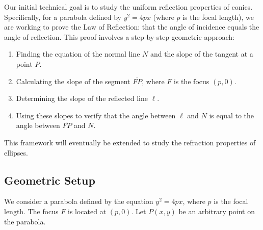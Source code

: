 \documentclass{article}
\begin{document}
Our initial technical goal is to study the uniform reflection properties of conics. Specifically, for a parabola defined by $y^2 = 4px$ (where $p$ is the focal length), we are working to prove the Law of Reflection: that the angle of incidence equals the angle of reflection. This proof involves a step-by-step geometric approach:
\begin{enumerate}
    \item Finding the equation of the normal line $N$ and the slope of the tangent at a point $P$.
    \item Calculating the slope of the segment $\overline{FP}$, where $F$ is the focus $(p, 0)$.
    \item Determining the slope of the reflected line $\ell$.
    \item Using these slopes to verify that the angle between $\ell$ and $N$ is equal to the angle between $\overline{FP}$ and $N$.
\end{enumerate}
This framework will eventually be extended to study the refraction properties of ellipses.

\subsection{Geometric Setup}
We consider a parabola defined by the equation $y^2 = 4px$, where $p$ is the focal length. The focus $F$ is located at $(p, 0)$. Let $P(x, y)$ be an arbitrary point on the parabola. 
\end{document}
